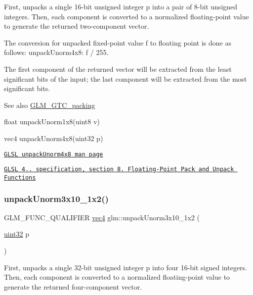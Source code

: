 First, unpacks a single 16-\/bit unsigned integer p into a pair of 8-\/bit unsigned integers. Then, each component is converted to a normalized floating-\/point value to generate the returned two-\/component vector.

The conversion for unpacked fixed-\/point value f to floating point is done as follows\+: unpack\+Unorm4x8\+: f / 255.

The first component of the returned vector will be extracted from the least significant bits of the input; the last component will be extracted from the most significant bits.

\begin{DoxySeeAlso}{See also}
\hyperlink{group__gtc__packing}{G\+L\+M\+\_\+\+G\+T\+C\+\_\+packing} 

float unpack\+Unorm1x8(uint8 v) 

vec4 unpack\+Unorm4x8(uint32 p) 

\href{http://www.opengl.org/sdk/docs/manglsl/xhtml/unpackUnorm4x8.xml}{\tt G\+L\+SL unpack\+Unorm4x8 man page} 

\href{http://www.opengl.org/registry/doc/GLSLangSpec.4.20.8.pdf}{\tt G\+L\+SL 4.. specification, section 8. Floating-\/\+Point Pack and Unpack Functions} 
\end{DoxySeeAlso}
\mbox{\label{group__gtc__packing_gaf69ace2b5e9234f8afb4e99c3df1193d}} 
\subsubsection{\texorpdfstring{unpack\+Unorm3x10\+\_\+1x2()}{unpackUnorm3x10\_1x2()}}
{\footnotesize\ttfamily G\+L\+M\+\_\+\+F\+U\+N\+C\+\_\+\+Q\+U\+A\+L\+I\+F\+I\+ER \hyperlink{group__core__types_ga5881b1b022d7fd1b7218f5916532dd02}{vec4} glm\+::unpack\+Unorm3x10\+\_\+1x2 (\begin{DoxyParamCaption}\item[{\hyperlink{group__gtc__type__precision_ga202b6a53c105fcb7e531f9b443518451}{uint32}}]{p }\end{DoxyParamCaption})}

First, unpacks a single 32-\/bit unsigned integer p into four 16-\/bit signed integers. Then, each component is converted to a normalized floating-\/point value to generate the returned four-\/component vector.


